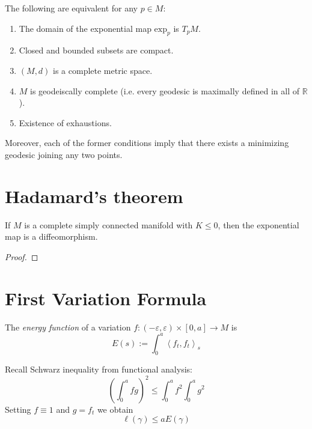 \begin{theorem}
\label{theorem-Hopf-Rinow}
The following are equivalent for any $p \in M$:
\begin{enumerate}
\item The domain of the exponential map $\text{exp}_p$ is $T_pM$.
\item Closed and bounded subsets are compact.
\item $(M,d)$ is a complete metric space.
\item $M$ is geodeiscally complete (i.e. every geodesic is maximally defined in
all of $\mathbb{R}$).
\item Existence of exhaustions.
\end{enumerate}
Moreover, each of the former conditions imply that there exists a minimizing 
geodesic joining any two points.
\end{theorem}

\section{Hadamard's theorem}
\label{section-Hadamard}

\begin{theorem}[Hadamard]
\label{theorem-Hadamard}
If $M$ is a complete simply connected manifold with $K\leq 0$, then the 
exponential map is a diffeomorphism.
\end{theorem}

\begin{proof}

\end{proof}

\section{First Variation Formula}
\label{section-first-variation}

\begin{definition}
\label{definition-energy}
The {\it energy function} of a variation
$f:(-\varepsilon,\varepsilon)\times[0,a]\to M$ is
$$
E(s):=\int_0^a\left<f_t,f_t\right>_s
$$
\end{definition}

Recall Schwarz inequality from functional analysis:
$$
\left(\int_0^afg\right)^2\leq \int_0^af^2\int_0^ag^2
$$
Setting $f\equiv1$ and $g=f_t$ we obtain
 \begin{equation}
\label{equation-energy-bounds-length}
\ell(\gamma)\leq aE(\gamma)
\end{equation}

